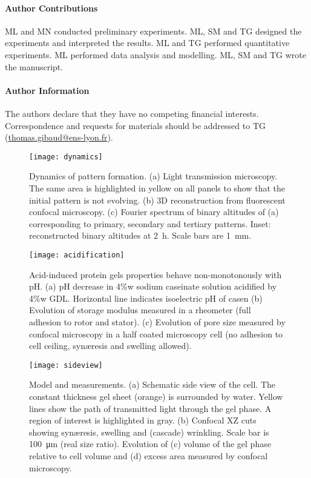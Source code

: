 \documentclass[twocolumn,superscriptaddress,showpacs,preprintnumbers,amsmath,amssymb,prl]{revtex4-1}
\begin{document}
\paragraph*{Author Contributions}
ML and MN conducted preliminary experiments. ML, SM and TG designed the experiments and interpreted the results. ML and TG performed quantitative experiments. ML performed data analysis and modelling. ML, SM and TG wrote the manuscript.


\paragraph*{Author Information} 
The authors declare that they have no competing financial interests. 
Correspondence and requests for materials should be addressed to TG (\href{mailto:thomas.gibaud@ens-lyon.fr}{thomas.gibaud@ens-lyon.fr}).



\begin{figure}
	\texttt{[image: dynamics]}
	\caption{Dynamics of pattern formation. (a) Light transmission microscopy. The same area is highlighted in yellow on all panels to show that the initial pattern is not evolving. (b) 3D reconstruction from fluorescent confocal microscopy. (c) Fourier spectrum of binary altitudes of (a) corresponding to primary, secondary and tertiary patterns. Inset: reconstructed binary altitudes at \SI{2}{\hour}. Scale bars are \SI{1}{\milli\metre}.}
	\label{fig:dynamics}
\end{figure}

\begin{figure}
	\texttt{[image: acidification]}
	\caption{Acid-induced protein gels properties behave non-monotonously with pH. (a) pH decrease in 4\%w sodium caseinate solution acidified by 4\%w GDL. Horizontal line indicates isoelectric pH of casen (b) Evolution of storage modulus measured in a rheometer (full adhesion to rotor and stator). (c) Evolution of pore size measured by confocal microscopy in a half coated microscopy cell (no adhesion to cell ceiling, syn\ae{}resis and swelling allowed).}
	\label{fig:acidification}
\end{figure}

\begin{figure}
	\texttt{[image: sideview]}
	\caption{Model and measurements. (a) Schematic side view of the cell. The constant thickness gel sheet (orange) is surrounded by water. Yellow lines show the path of transmitted light through the gel phase. A region of interest is highlighted in gray. (b) Confocal XZ cuts showing syn\ae{}resis, swelling and (cascade) wrinkling. Scale bar is \SI{100}{\micro\metre} (real size ratio). Evolution of (c) volume of the gel phase relative to cell volume and (d) excess area measured by confocal microscopy.}
	\label{fig:sideview}
\end{figure}
\end{document}
